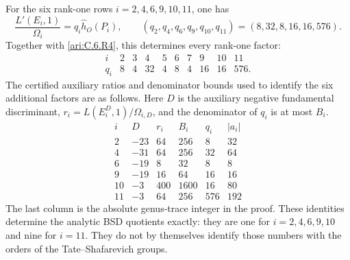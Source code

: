 \begin{proposition}\label{ari:C.6.R5}
For the six rank-one rows $i=2,4,6,9,10,11$, one has
\[
 \frac{L'(E_i,1)}{\Omega_i}
   =q_i\widehat h_O(P_i),\qquad
 (q_2,q_4,q_6,q_9,q_{10},q_{11})=(8,32,8,16,16,576).
\]
Together with \ref{ari:C.6.R4}, this determines every rank-one factor:
\[
\begin{array}{c|rrrrrrrrr}
 i&2&3&4&5&6&7&9&10&11\\\hline
 q_i&8&4&32&4&8&4&16&16&576.
\end{array}
\]
The certified auxiliary ratios and denominator bounds used to identify
the six additional factors are as follows. Here $D$ is the auxiliary
negative fundamental discriminant,
$r_i=L(E_i^D,1)/\Omega_{i,D}$, and the denominator of $q_i$ is at most
$B_i$.
\[
\begin{array}{c|r|r|r|r|r}
 i&D&r_i&B_i&q_i&|a_i|\\\hline
 2&-23&64&256&8&32\\
 4&-31&64&256&32&64\\
 6&-19&8&32&8&8\\
 9&-19&16&64&16&16\\
 10&-3&400&1600&16&80\\
 11&-3&64&256&576&192
\end{array}
\]
The last column is the absolute genus-trace integer in the proof. These
identities determine the analytic BSD quotients exactly: they are one
for $i=2,4,6,9,10$ and nine for $i=11$. They do not by themselves
identify those numbers with the orders of the Tate--Shafarevich groups.
\end{proposition}


